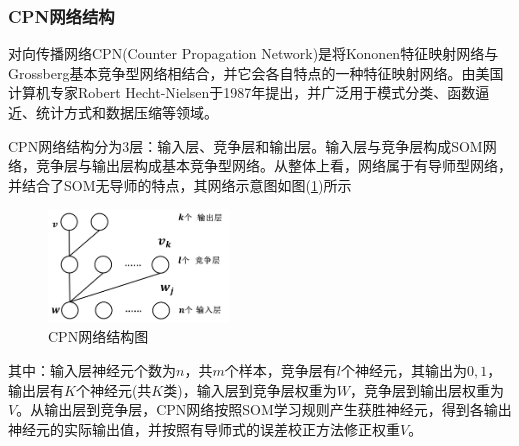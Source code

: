 {        \subsubsection{CPN网络结构}
            \par
            对向传播网络CPN(Counter Propagation Network)是将Kononen特征映射网络与Grossberg基本竞争型网络相结合，并它会各自特点的一种特征映射网络。由美国计算机专家Robert Hecht-Nielsen于1987年提出，并广泛用于模式分类、函数逼近、统计方式和数据压缩等领域。
            \par
            CPN网络结构分为3层：输入层、竞争层和输出层。输入层与竞争层构成SOM网络，竞争层与输出层构成基本竞争型网络。从整体上看，网络属于有导师型网络，并结合了SOM无导师的特点，其网络示意图如图(\ref{fig:CPN网络结构图})所示
            \begin{figure}[H]
            \centering
            \includegraphics[height=3cm]{images/CPN_net_sructure.png}
            \caption{CPN网络结构图}
            \label{fig:CPN网络结构图}
            \end{figure}
            其中：输入层神经元个数为$n$，共$m$个样本，竞争层有$l$个神经元，其输出为$0,1$，输出层有$K$个神经元(共$K$类)，输入层到竞争层权重为$W$，竞争层到输出层权重为$V$。从输出层到竞争层，CPN网络按照SOM学习规则产生获胜神经元，得到各输出神经元的实际输出值，并按照有导师式的误差校正方法修正权重$V$。
}
